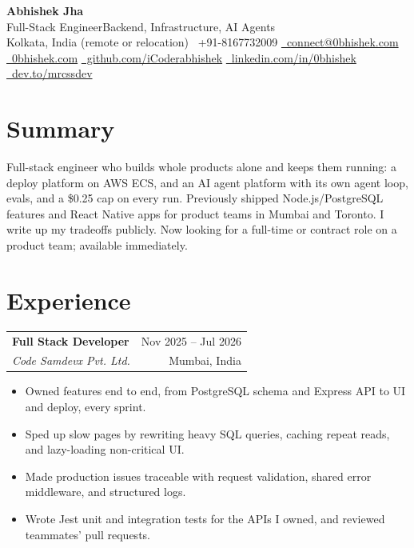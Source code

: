 \documentclass[a4paper,11pt]{article}
\makeatletter
\newcommand{\sep}{\enspace\textperiodcentered\enspace}
\newcommand{\entry}[4]{%
  \begin{tabular*}{\textwidth}{@{}l@{\extracolsep{\fill}}r@{}}
    \textbf{#1} & \small #2 \\
    \small\textit{#3} & \small #4
  \end{tabular*}\par
}
\newenvironment{bullets}
  {\begin{itemize}[leftmargin=1.1em, labelsep=0.5em, topsep=2pt, itemsep=1pt, parsep=0pt, partopsep=0pt, label=\textbullet]\small}
  {\end{itemize}}
\makeatother
\begin{document}
\begin{center}
  {\LARGE\textbf{Abhishek Jha}}\\[3pt]
  {\small Full-Stack Engineer\sep Backend, Infrastructure, AI Agents}\\[4pt]
  {\small
    Kolkata, India (remote or relocation) \quad
    \faPhone\ +91-8167732009 \quad
    \href{mailto:connect@0bhishek.com}{\faEnvelope\ connect@0bhishek.com}}\\[2pt]
  {\small
    \href{https://0bhishek.com}{\faGlobe\ 0bhishek.com} \quad
    \href{https://github.com/iCoderabhishek}{\faGithub\ github.com/iCoderabhishek} \quad
    \href{https://www.linkedin.com/in/0bhishek}{\faLinkedin\ linkedin.com/in/0bhishek} \quad
    \href{https://dev.to/mrcssdev}{\faDev\ dev.to/mrcssdev}}
\end{center}
\vspace{-6pt}

\section{Summary}
{\small Full-stack engineer who builds whole products alone and keeps them running: a deploy platform on AWS ECS, and an AI agent platform with its own agent loop, evals, and a \$0.25 cap on every run. Previously shipped Node.js/PostgreSQL features and React Native apps for product teams in Mumbai and Toronto. I write up my tradeoffs publicly. Now looking for a full-time or contract role on a product team; available immediately.}

\section{Experience}
\entry{Full Stack Developer}{Nov 2025 -- Jul 2026}{Code Samdevx Pvt. Ltd.}{Mumbai, India}
\begin{bullets}
  \item Owned features end to end, from PostgreSQL schema and Express API to UI and deploy, every sprint.
  \item Sped up slow pages by rewriting heavy SQL queries, caching repeat reads, and lazy-loading non-critical UI.
  \item Made production issues traceable with request validation, shared error middleware, and structured logs.
  \item Wrote Jest unit and integration tests for the APIs I owned, and reviewed teammates' pull requests.
\end{bullets}
\end{document}
